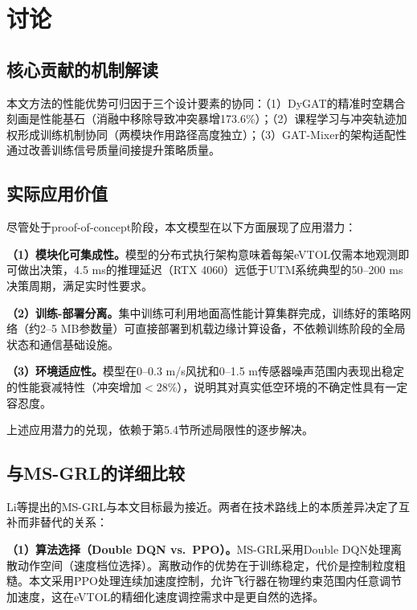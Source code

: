 \documentclass[12pt,a4paper,UTF8]{ctexart}
\begin{document}
\section{讨论}

\subsection{核心贡献的机制解读}

本文方法的性能优势可归因于三个设计要素的协同：（1）DyGAT的精准时空耦合刻画是性能基石（消融中移除导致冲突暴增173.6\%）；（2）课程学习与冲突轨迹加权形成训练机制协同（两模块作用路径高度独立）；（3）GAT-Mixer的架构适配性通过改善训练信号质量间接提升策略质量。

\subsection{实际应用价值}

尽管处于proof-of-concept阶段，本文模型在以下方面展现了应用潜力：

\textbf{（1）模块化可集成性。}模型的分布式执行架构意味着每架eVTOL仅需本地观测即可做出决策，4.5 ms的推理延迟（RTX 4060）远低于UTM系统典型的50--200 ms决策周期，满足实时性要求。

\textbf{（2）训练-部署分离。}集中训练可利用地面高性能计算集群完成，训练好的策略网络（约2--5 MB参数量）可直接部署到机载边缘计算设备，不依赖训练阶段的全局状态和通信基础设施。

\textbf{（3）环境适应性。}模型在0--0.3 m/s风扰和0--1.5 m传感器噪声范围内表现出稳定的性能衰减特性（冲突增加$<28\%$），说明其对真实低空环境的不确定性具有一定容忍度。

上述应用潜力的兑现，依赖于第5.4节所述局限性的逐步解决。

\subsection{与MS-GRL的详细比较}

Li等提出的MS-GRL\cite{ref24}与本文目标最为接近。两者在技术路线上的本质差异决定了互补而非替代的关系：

\textbf{（1）算法选择（Double DQN vs.\ PPO）。}MS-GRL采用Double DQN处理离散动作空间（速度档位选择）。离散动作的优势在于训练稳定，代价是控制粒度粗糙。本文采用PPO处理连续加速度控制，允许飞行器在物理约束范围内任意调节加速度，这在eVTOL的精细化速度调控需求中是更自然的选择。
\end{document}
